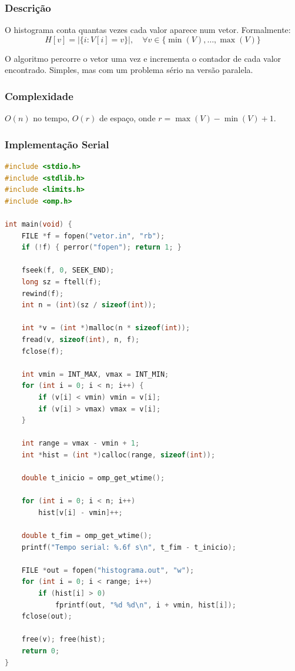 \documentclass[12pt]{article}
\begin{document}
\subsubsection{Descrição}

O histograma conta quantas vezes cada valor aparece num vetor. Formalmente:
\begin{equation}
H[v] = |\{i : V[i] = v\}|, \quad \forall v \in \{\min(V), \ldots, \max(V)\}
\end{equation}

O algoritmo percorre o vetor uma vez e incrementa o contador de cada valor encontrado. Simples, mas com um problema sério na versão paralela.

\subsubsection{Complexidade}

$O(n)$ no tempo, $O(r)$ de espaço, onde $r = \max(V) - \min(V) + 1$.

\subsubsection{Implementação Serial}

\begin{lstlisting}[language=C, caption={Histograma serial}]
#include <stdio.h>
#include <stdlib.h>
#include <limits.h>
#include <omp.h>

int main(void) {
    FILE *f = fopen("vetor.in", "rb");
    if (!f) { perror("fopen"); return 1; }

    fseek(f, 0, SEEK_END);
    long sz = ftell(f);
    rewind(f);
    int n = (int)(sz / sizeof(int));

    int *v = (int *)malloc(n * sizeof(int));
    fread(v, sizeof(int), n, f);
    fclose(f);

    int vmin = INT_MAX, vmax = INT_MIN;
    for (int i = 0; i < n; i++) {
        if (v[i] < vmin) vmin = v[i];
        if (v[i] > vmax) vmax = v[i];
    }

    int range = vmax - vmin + 1;
    int *hist = (int *)calloc(range, sizeof(int));

    double t_inicio = omp_get_wtime();

    for (int i = 0; i < n; i++)
        hist[v[i] - vmin]++;

    double t_fim = omp_get_wtime();
    printf("Tempo serial: %.6f s\n", t_fim - t_inicio);

    FILE *out = fopen("histograma.out", "w");
    for (int i = 0; i < range; i++)
        if (hist[i] > 0)
            fprintf(out, "%d %d\n", i + vmin, hist[i]);
    fclose(out);

    free(v); free(hist);
    return 0;
}
\end{lstlisting}
\end{document}

